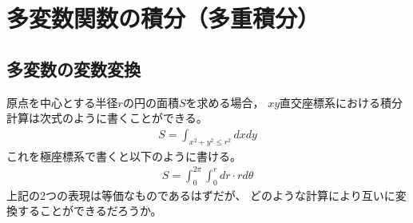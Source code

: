 \documentclass[twocolumn,11pt]{jarticle}
\begin{document}






\section{多変数関数の積分（多重積分）}

\subsection{多変数の変数変換}
原点を中心とする半径$r$の円の面積$S$を求める場合，
$xy$直交座標系における積分計算は次式のように書くことができる。
\begin{align}
  \label{eq:circle-xy}
  S=\int_{x^2+y^2\le r^2}dxdy
\end{align}
これを極座標系で書くと以下のように書ける。
\begin{align}
  \label{eq:circle-rtheta}
  S=\int_{0}^{2\pi}\int_0^rdr\cdot rd\theta 
\end{align}
上記の2つの表現は等価なものであるはずだが、
どのような計算により互いに変換することができるだろうか。
\end{document}
